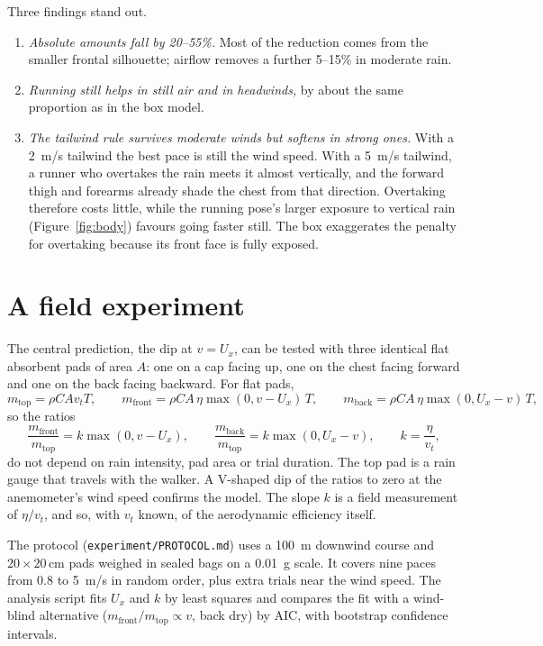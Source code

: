 \documentclass[11pt,a4paper]{article}
\begin{document}
Three findings stand out.
\begin{enumerate}
\item \emph{Absolute amounts fall by 20--55\%.} Most of the reduction comes from the smaller frontal silhouette; airflow removes a further 5--15\% in moderate rain.
\item \emph{Running still helps in still air and in headwinds,} by about the same proportion as in the box model.
\item \emph{The tailwind rule survives moderate winds but softens in strong ones.} With a \SI{2}{m/s} tailwind the best pace is still the wind speed. With a \SI{5}{m/s} tailwind, a runner who overtakes the rain meets it almost vertically, and the forward thigh and forearms already shade the chest from that direction. Overtaking therefore costs little, while the running pose's larger exposure to vertical rain (Figure~\ref{fig:body}) favours going faster still. The box exaggerates the penalty for overtaking because its front face is fully exposed.
\end{enumerate}

\section{A field experiment}\label{sec:exp}
The central prediction, the dip at $v=U_x$, can be tested with three identical flat absorbent pads of area $A$: one on a cap facing up, one on the chest facing forward and one on the back facing backward. For flat pads,
\begin{equation}
m_{\mathrm{top}}=\rho C A v_t T,\qquad m_{\mathrm{front}}=\rho C A\,\eta\max(0,v-U_x)\,T,\qquad m_{\mathrm{back}}=\rho C A\,\eta\max(0,U_x-v)\,T,
\end{equation}
so the ratios
\begin{equation}
\frac{m_{\mathrm{front}}}{m_{\mathrm{top}}}=k\max(0,v-U_x),\qquad \frac{m_{\mathrm{back}}}{m_{\mathrm{top}}}=k\max(0,U_x-v),\qquad k=\frac{\eta}{v_t},
\end{equation}
do not depend on rain intensity, pad area or trial duration. The top pad is a rain gauge that travels with the walker. A V-shaped dip of the ratios to zero at the anemometer's wind speed confirms the model. The slope $k$ is a field measurement of $\eta/v_t$, and so, with $v_t$ known, of the aerodynamic efficiency itself.

The protocol (\texttt{experiment/PROTOCOL.md}) uses a \SI{100}{m} downwind course and $20\times20$\,cm pads weighed in sealed bags on a \SI{0.01}{g} scale. It covers nine paces from 0.8 to \SI{5}{m/s} in random order, plus extra trials near the wind speed. The analysis script fits $U_x$ and $k$ by least squares and compares the fit with a wind-blind alternative ($m_{\mathrm{front}}/m_{\mathrm{top}}\propto v$, back dry) by AIC, with bootstrap confidence intervals.
\end{document}
